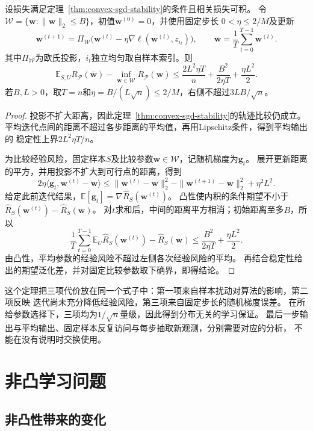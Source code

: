 \begin{theorem}[平均投影SGD的期望风险保证]
\label{thm:averaged-sgd-learning}
设损失满足定理~\ref{thm:convex-sgd-stability}的条件且相关损失可积。
令$\mathcal W=\{\bm w:\|\bm w\|_2\leq B\}$，初值$\bm w^{(0)}=0$，并使用固定步长
$0<\eta\leq2/M$及更新
\[
 \bm w^{(t+1)}=\Pi_{\mathcal W}
   \bigl(\bm w^{(t)}-\eta\nabla\ell(\bm w^{(t)},z_{i_t})\bigr),
 \qquad
 \bar{\bm w}=\frac1T\sum_{t=0}^{T-1}\bm w^{(t)}.
\]
其中$\Pi_{\mathcal W}$为欧氏投影，$i_t$独立均匀取自样本索引。则
\[
 \mathbb E_{S,U}R_{\mathcal P}(\bar{\bm w})-\inf_{\bm w\in\mathcal W}R_{\mathcal P}(\bm w)
 \leq\frac{2L^2\eta T}{n}+\frac{B^2}{2\eta T}+\frac{\eta L^2}{2}.
\]
若$B,L>0$，取$T=n$和$\eta=B/(L\sqrt n)\leq2/M$，右侧不超过$3LB/\sqrt n$。
\end{theorem}
\begin{proof}
投影不扩大距离，因此定理~\ref{thm:convex-sgd-stability}的轨迹比较仍成立。
平均迭代点间的距离不超过各步距离的平均值，再用Lipschitz条件，得到平均输出的
稳定性上界$2L^2\eta T/n$。

为比较经验风险，固定样本$S$及比较参数$\bm w\in\mathcal W$，记随机梯度为$\bm g_t$。
展开更新距离的平方，并用投影不扩大到可行点的距离，得到
\[
 2\eta\langle\bm g_t,\bm w^{(t)}-\bm w\rangle
 \leq\|\bm w^{(t)}-\bm w\|_2^2
 -\|\bm w^{(t+1)}-\bm w\|_2^2+\eta^2L^2.
\]
给定此前迭代结果，$\mathbb E[\bm g_t]=\nabla\hat R_S(\bm w^{(t)})$。
凸性使内积的条件期望不小于
$\hat R_S(\bm w^{(t)})-\hat R_S(\bm w)$。
对$t$求和后，中间的距离平方相消；初始距离至多$B$，所以
\[
 \frac1T\sum_{t=0}^{T-1}\mathbb E_U\hat R_S(\bm w^{(t)})-\hat R_S(\bm w)
 \leq\frac{B^2}{2\eta T}+\frac{\eta L^2}{2}.
\]
由凸性，平均参数的经验风险不超过左侧各次经验风险的平均。
再结合稳定性给出的期望泛化差，并对固定比较参数取下确界，即得结论。
\end{proof}

这个定理把三项代价放在同一个式子中：第一项来自样本扰动对算法的影响，第二项反映
迭代尚未充分降低经验风险，第三项来自固定步长的随机梯度误差。
在所给参数选择下，三项均为$1/\sqrt n$量级，因此得到分布无关的学习保证。
最后一步输出与平均输出、固定样本反复访问与每步抽取新观测，分别需要对应的分析，
不能在没有说明时交换使用。

\section{非凸学习问题}
\label{sec:nonconvex-learning}

\subsection{非凸性带来的变化}

